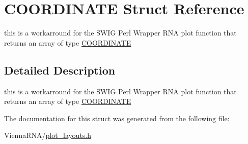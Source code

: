 \hypertarget{structCOORDINATE}{}\section{C\+O\+O\+R\+D\+I\+N\+A\+TE Struct Reference}
\label{structCOORDINATE}


this is a workarround for the S\+W\+IG Perl Wrapper R\+NA plot function that returns an array of type \hyperlink{structCOORDINATE}{C\+O\+O\+R\+D\+I\+N\+A\+TE}  




\subsection{Detailed Description}
this is a workarround for the S\+W\+IG Perl Wrapper R\+NA plot function that returns an array of type \hyperlink{structCOORDINATE}{C\+O\+O\+R\+D\+I\+N\+A\+TE} 

The documentation for this struct was generated from the following file\+:\begin{DoxyCompactItemize}
\item 
Vienna\+R\+N\+A/\hyperlink{plot__layouts_8h}{plot\+\_\+layouts.\+h}\end{DoxyCompactItemize}
